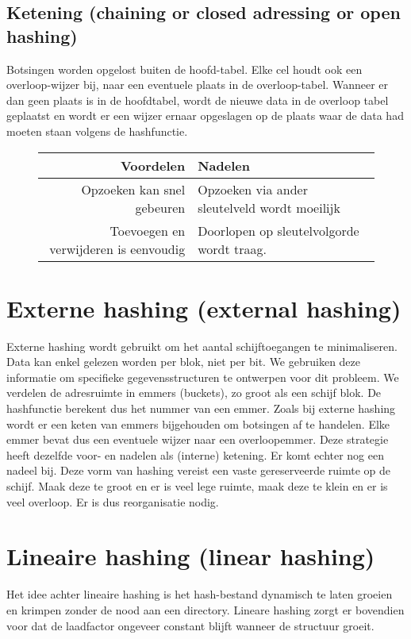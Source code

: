 \documentclass[hashing.tex]{subfiles}
\begin{document}
\subsection{Ketening (chaining or closed adressing or open hashing)}
Botsingen worden opgelost buiten de hoofd-tabel. Elke cel houdt ook een overloop-wijzer bij, naar een eventuele plaats in de overloop-tabel. Wanneer er dan geen plaats is in de hoofdtabel, wordt de nieuwe data in de overloop tabel geplaatst en wordt er een wijzer ernaar opgeslagen op de plaats waar de data had moeten staan volgens de hashfunctie.
\begin{figure}[H]
\centering
\begin{tabular}{r|l}
Voordelen & Nadelen\\
\hline
Opzoeken kan snel gebeuren & Opzoeken via ander sleutelveld wordt moeilijk\\
Toevoegen en verwijderen is eenvoudig & Doorlopen op sleutelvolgorde wordt traag.
\end{tabular}
\end{figure}

\section{Externe hashing (external hashing)}
Externe hashing wordt gebruikt om het aantal schijftoegangen te minimaliseren. Data kan enkel gelezen worden per blok, niet per bit. We gebruiken deze informatie om specifieke gegevensstructuren te ontwerpen voor dit probleem.
We verdelen de adresruimte in emmers (buckets), zo groot als een schijf blok. De hashfunctie berekent dus het nummer van een emmer.
Zoals bij externe hashing wordt er een keten van emmers bijgehouden om botsingen af te handelen. Elke emmer bevat dus een eventuele wijzer naar een overloopemmer.
Deze strategie heeft dezelfde voor- en nadelen als (interne) ketening. Er komt echter nog een nadeel bij. Deze vorm van hashing vereist een vaste gereserveerde ruimte op de schijf. Maak deze te groot en er is veel lege ruimte, maak deze te klein en er is veel overloop. Er is dus reorganisatie nodig.

\section{Lineaire hashing (linear hashing)}
Het idee achter lineaire hashing is het hash-bestand dynamisch te laten groeien en krimpen zonder de nood aan een directory. Lineare hashing zorgt er bovendien voor dat de laadfactor ongeveer constant blijft wanneer de structuur groeit.
\end{document}
